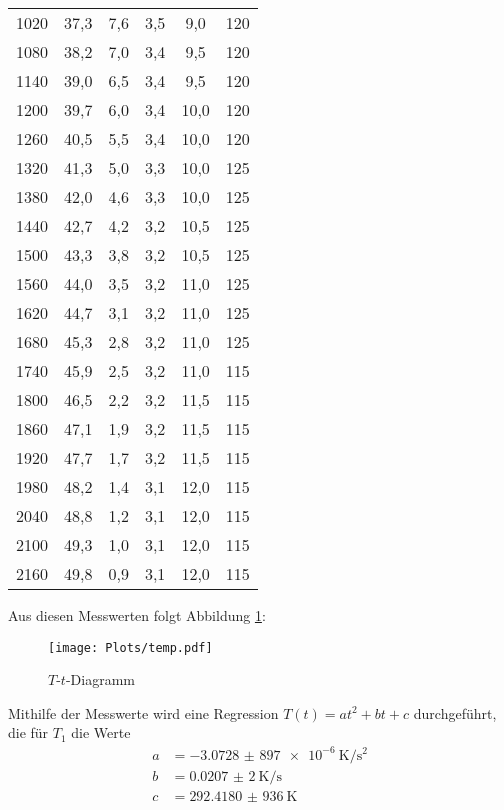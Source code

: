 \begin{table}[H]
\begin{tabular}{c S S S S c}
    1020  &  37,3  &  7,6  &  3,5  &  9,0	  &  120  \\
    1080  &  38,2  &  7,0  &  3,4  &  9,5	  &  120  \\
    1140  &  39,0  &  6,5  &  3,4  &  9,5	  &  120  \\
    1200  &  39,7  &  6,0  &  3,4  &  10,0  &  	120  \\
    1260  &  40,5  &  5,5  &  3,4  &  10,0  &  	120  \\
    1320  &  41,3  &  5,0  &  3,3  &  10,0  &  	125  \\
    1380  &  42,0  &  4,6  &  3,3  &  10,0  &  	125  \\
    1440  &  42,7  &  4,2  &  3,2  &  10,5  &  	125  \\
    1500  &  43,3  &  3,8  &  3,2  &  10,5  &  	125  \\
    1560  &  44,0  &  3,5  &  3,2  &  11,0  &  	125  \\
    1620  &  44,7  &  3,1  &  3,2  &  11,0  &  	125  \\
    1680  &  45,3  &  2,8  &  3,2  &  11,0  &  	125  \\
    1740  &  45,9  &  2,5  &  3,2  &  11,0  &  	115  \\
    1800  &  46,5  &  2,2  &  3,2  &  11,5  &  	115  \\
    1860  &  47,1  &  1,9  &  3,2  &  11,5  &  	115  \\
    1920  &  47,7  &  1,7  &  3,2  &  11,5  &  	115  \\
    1980  &  48,2  &  1,4  &  3,1  &  12,0  &  	115  \\
    2040  &  48,8  &  1,2  &  3,1  &  12,0  &  	115  \\
    2100  &  49,3  &  1,0  &  3,1  &  12,0  &  	115  \\
    2160  &  49,8  &  0,9  &  3,1  &  12,0  &  	115  \\
    \bottomrule
  \end{tabular}
\end{table}

Aus diesen Messwerten folgt Abbildung \ref{fig:temp}:
\begin{figure}[H]
  \centering
  \texttt{[image: Plots/temp.pdf]}
  \caption{$T$-$t$-Diagramm}
  \label{fig:temp}
\end{figure}

Mithilfe der Messwerte wird eine Regression $T(t) = a t^2 + b t + c$ durchgeführt, die für $T_1$ die Werte
\begin{align*}
  a &= \SI{-3,0728(897)e-6}{\kelvin \per \square \second} \\
  b &= \SI{0,0207(2)}{\kelvin \per \second} \\
  c &= \SI{292,4180(936)}{\kelvin}
\end{align*}

